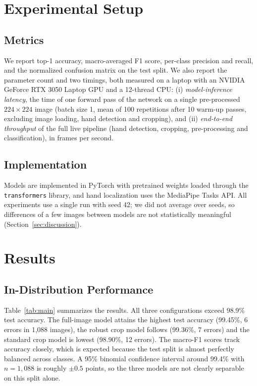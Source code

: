 \documentclass[conference]{IEEEtran}
\begin{document}
\section{Experimental Setup}
\label{sec:setup}
\subsection{Metrics}
We report top-1 accuracy, macro-averaged F1 score, per-class precision and recall, and the normalized confusion matrix on the test split. We also report the parameter count and two timings, both measured on a laptop with an NVIDIA GeForce RTX 3050 Laptop GPU and a 12-thread CPU: (i) \emph{model-inference latency}, the time of one forward pass of the network on a single pre-processed $224\times224$ image (batch size 1, mean of 100 repetitions after 10 warm-up passes, excluding image loading, hand detection and cropping), and (ii) \emph{end-to-end throughput} of the full live pipeline (hand detection, cropping, pre-processing and classification), in frames per second.

\subsection{Implementation}
Models are implemented in PyTorch with pretrained weights loaded through the \texttt{transformers} library, and hand localization uses the MediaPipe Tasks API. All experiments use a single run with seed 42; we did not average over seeds, so differences of a few images between models are not statistically meaningful (Section~\ref{sec:discussion}).

\section{Results}
\label{sec:results}

\subsection{In-Distribution Performance}
Table~\ref{tab:main} summarizes the results. All three configurations exceed 98.9\% test accuracy. The full-image model attains the highest test accuracy (99.45\%, 6 errors in 1{,}088 images), the robust crop model follows (99.36\%, 7 errors) and the standard crop model is lowest (98.90\%, 12 errors). The macro-F1 scores track accuracy closely, which is expected because the test split is almost perfectly balanced across classes. A 95\% binomial confidence interval around 99.4\% with $n=1{,}088$ is roughly $\pm0.5$ points, so the three models are not clearly separable on this split alone.
\end{document}
